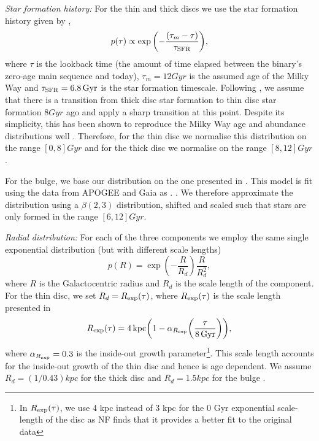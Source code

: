 \textit{Star formation history:} For the thin and thick discs we use the star formation history given by \citet[][Eq.~2]{Frankel+2018},
\begin{equation}\label{eq:thin_disc_tau}
    p(\tau) \propto \exp \qty(-\frac{(\tau_m - \tau)}{\tau_{\rm SFR}}),
\end{equation}
where $\tau$ is the lookback time (the amount of time elapsed between the binary's zero-age main sequence and today), $\tau_m = 12 \unit{Gyr}$ is the assumed age of the Milky Way and $\tau_{\rm SFR} = 6.8 \unit{Gyr}$ is the star formation timescale. Following \citet{Frankel+2018}, we assume that there is a transition from thick disc star formation to thin disc star formation $8 \unit{Gyr}$ ago and apply a sharp transition at this point. Despite its simplicity, this has been shown to reproduce the Milky Way age and abundance distributions well \citep{Sharma+2020} . Therefore, for the thin disc we normalise this distribution on the range $[0, 8] \unit{Gyr}$ and for the thick disc we normalise on the range $[8, 12] \unit{Gyr}$.

For the bulge, we base our distribution on the one presented in \citet[][Fig.~7]{Bovy+2019}. This model is fit using the data from APOGEE and Gaia as \citet{Frankel+2018}. . We therefore approximate the distribution using a $\beta(2,3)$ distribution, shifted and scaled such that stars are only formed in the range $[6, 12] \unit{Gyr}$.

\textit{Radial distribution:} For each of the three components we employ the same single exponential distribution (but with different scale lengths)
\begin{equation}\label{eq:galaxy_R}
    p(R) = \exp(-\frac{R}{R_d}) \frac{R}{R_d^2},
\end{equation}
where $R$ is the Galactocentric radius and $R_d$ is the scale length of the component. For the thin disc, we set $R_d = R_{\rm exp}(\tau)$, where $R_{\rm exp}(\tau)$ is the scale length presented in \citet[][Eq.~5]{Frankel+2018}
\begin{equation}
    R_{\rm exp}(\tau) = 4 \unit{kpc} \qty(1 - \alpha_{R_{\rm exp}} \qty(\frac{\tau}{8 \unit{Gyr}})),
\end{equation}
where $\alpha_{R_{\rm exp}} = 0.3$ is the inside-out growth parameter\footnote{In $R_{\rm exp}(\tau)$, we use 4 kpc instead of 3 kpc for the 0 Gyr exponential scale-length of the disc as NF finds that it provides a better fit to the original data}. This scale length accounts for the inside-out growth of the thin disc and hence is age dependent. We assume $R_d = (1 / 0.43) \unit{kpc}$ for the thick disc \citep[][Table~1]{Bovy+2016} and $R_d = 1.5 \unit{kpc}$ for the bulge \citep{Bovy+2019}.

